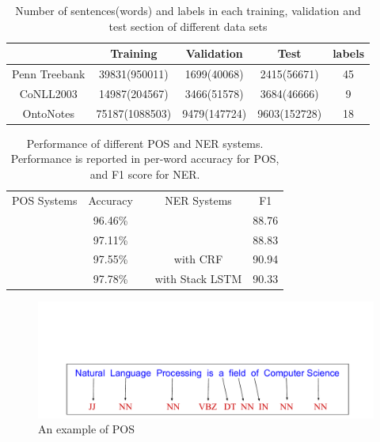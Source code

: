 \documentclass{sfuthesis}
\begin{document}

\begin{table}[]
\centering
\caption{Number of sentences(words) and labels in each training, validation and test section of different data sets}
\label{table:my-dataset}
\begin{tabular}{|c|c|c|c|c|} \hline
      & Training  & Validation  & Test  & labels  \\ \hline
Penn Treebank   &39831(950011) &1699(40068) &2415(56671) &45\\\hline
CoNLL2003   &14987(204567) &3466(51578) &3684(46666) &9     \\\hline
OntoNotes   &75187(1088503) &9479(147724) &9603(152728) &18     \\\hline
\end{tabular}
\end{table}


\begin{table}[]
\centering
\caption{Performance of different POS and NER systems. Performance is reported in per-word accuracy for POS, and F1 score for NER. }
\label{table:my-performance}
\begin{tabular}{cclcc}
POS Systems       & Accuracy &  & NER Systems           & F1
\\ \cline{1-2} \cline{4-5} 
\text{\cite{mccallum2000maximum}} & 96.46\%                      &  & \text{\cite{florian2003named}}                 & 88.76                  \\
\text{\cite{collins2002discriminative}}    & 97.11\%                      &  & \text{\cite{huang2015bidirectional}}           & 88.83                  \\
\text{\cite{huang2015bidirectional}}       & 97.55\%                      &  & \text{\cite{lample2016neural}} with CRF        & 90.94                  \\
\text{\cite{ling2015finding}}              & 97.78\%                      &  & \text{\cite{lample2016neural}} with Stack LSTM & 90.33                 
\end{tabular}
\end{table}

\begin{figure}
  \centering
  \includegraphics[scale=0.5]{posex.pdf}
 \caption{An example of POS}
  \label{fig:pos-ex}
\end{figure}
\end{document}
